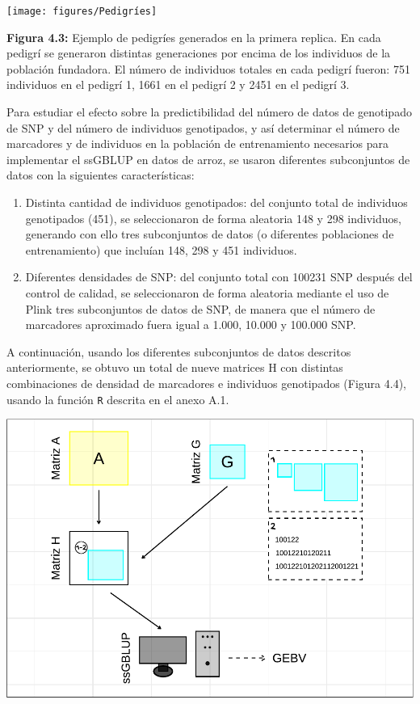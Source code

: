 \documentclass[11pt,spanish,a4paper,oneside,]{book} %
\begin{document}
\begin{center}\texttt{[image: figures/Pedigríes]} \end{center}

\noindent
\textbf{Figura 4.3:} Ejemplo de pedigríes generados en la primera replica. En cada pedigrí se generaron distintas generaciones por encima de los individuos de la población fundadora. El número de individuos totales en cada pedigrí fueron: 751 individuos en el pedigrí 1, 1661 en el pedigrí 2 y 2451 en el pedigrí 3.

\hspace*{1em}

Para estudiar el efecto sobre la predictibilidad del número de datos de genotipado de SNP y del número de individuos genotipados, y así determinar el número de marcadores y de individuos en la población de entrenamiento necesarios para implementar el ssGBLUP en datos de arroz, se usaron diferentes subconjuntos de datos con la siguientes características:

\begin{enumerate}
\def\labelenumi{\arabic{enumi}.}
\item
  Distinta cantidad de individuos genotipados: del conjunto total de individuos genotipados (451), se seleccionaron de forma aleatoria 148 y 298 individuos, generando con ello tres subconjuntos de datos (o diferentes poblaciones de entrenamiento) que incluían 148, 298 y 451 individuos.
\item
  Diferentes densidades de SNP: del conjunto total con 100231 SNP después del control de calidad, se seleccionaron de forma aleatoria mediante el uso de Plink tres subconjuntos de datos de SNP, de manera que el número de marcadores aproximado fuera igual a 1.000, 10.000 y 100.000 SNP.
\end{enumerate}

A continuación, usando los diferentes subconjuntos de datos descritos anteriormente, se obtuvo un total de nueve matrices H con distintas combinaciones de densidad de marcadores e individuos genotipados (Figura 4.4), usando la función \texttt{R} descrita en el anexo A.1.

\begin{center}\includegraphics[width=1\linewidth]{figures/Esquema_1} \end{center}
\end{document}
